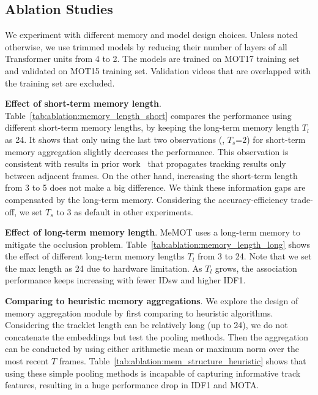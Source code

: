 \subsection{Ablation Studies}
\label{sec:exp:ablation}

We experiment with different memory and model design choices.
Unless noted otherwise, we use trimmed models by reducing their number of layers of all Transformer units from 4 to 2.
The models are trained on MOT17 training set and validated on MOT15 training set. Validation videos that are overlapped with the training set are excluded.

\vspace{3pt} \noindent \textbf{Effect of short-term memory length}.
Table~\ref{tab:ablation:memory_length_short} compares the performance using different short-term memory lengths, by keeping the long-term memory length $T_l$ as 24.
It shows that only using the last two observations (\ie, $T_s$=$2$) for short-term memory aggregation slightly decreases the performance.
This observation is consistent with results in prior work~\cite{sun2020transtrack,meinhardt2021trackformer} that propagates tracking results only between adjacent frames.
On the other hand, increasing the short-term length from 3 to 5 does not make a big difference.
We think these information gaps are compensated by the long-term memory.
Considering the accuracy-efficiency trade-off, we set $T_s$ to 3 as default in other experiments.    





\vspace{3pt} \noindent \textbf{Effect of long-term memory length}.
MeMOT uses a long-term memory to mitigate the occlusion problem.
Table~\ref{tab:ablation:memory_length_long} shows the effect of different long-term memory lengths $T_l$ from 3 to 24.
Note that we set the max length as 24 due to hardware limitation.
As $T_l$ grows, the association performance keeps increasing with fewer IDsw and higher IDF1.

\vspace{3pt} \noindent \textbf{Comparing to heuristic memory aggregations}.
We explore the design of memory aggregation module by first comparing to heuristic algorithms.
Considering the tracklet length can be relatively long (up to 24),
we do not concatenate the embeddings but test the pooling methods.
Then the aggregation can be conducted by using either arithmetic mean or maximum norm over the most recent $T$ frames.
Table~\ref{tab:ablation:mem_structure_heuristic} shows that using these simple pooling methods is incapable of capturing informative track features, resulting in a huge performance drop in IDF1 and MOTA.


